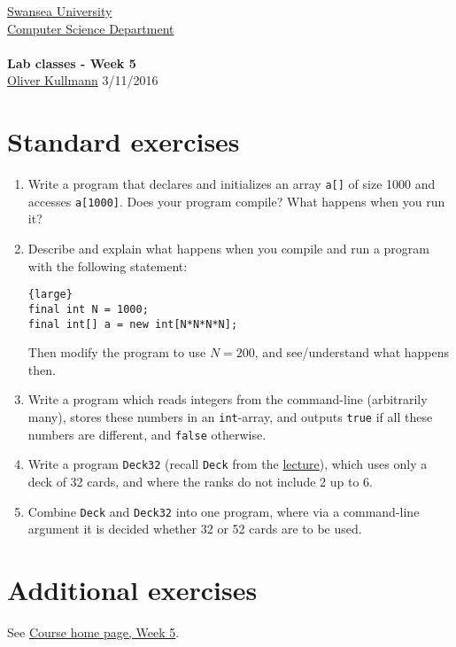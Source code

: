 \documentclass[11pt]{article}
\newcommand{\Java}{\lstset{language=Java,keywordstyle=\bfseries,breaklines,breakindent=30pt}}
\begin{document}
\begin{center}
  \href{http://www.swan.ac.uk/}{Swansea University}\\
  \href{http://www.swan.ac.uk/compsci/}{Computer Science Department}\\[1ex]
  \href{\chp}{\module}\\[1ex]
  \textbf{Lab classes - Week 5}\\
  \href{http://cs.swan.ac.uk/~csoliver}{Oliver Kullmann} 3/11/2016
\end{center}

\section{Standard exercises}
\label{sec:stdex}

\Java

\begin{enumerate}
\item Write a program that declares and initializes an array \texttt{a[]} of size 1000 and accesses \texttt{a[1000]}. Does your program compile? What happens when you run it?
\item Describe and explain what happens when you compile and run a program with the following statement:
  \begin{lstlisting}{large}
final int N = 1000;
final int[] a = new int[N*N*N*N];
  \end{lstlisting}
  Then modify the program to use $N = 200$, and see/understand what happens then.
\item Write a program which reads integers from the command-line (arbitrarily many), stores these numbers in an \texttt{int}-array, and outputs \texttt{true} if all these numbers are different, and \texttt{false} otherwise.
\item Write a program \texttt{Deck32} (recall \texttt{Deck} from the \href{http://cs.swan.ac.uk/~csoliver/ProgrammingJava201415_MgQxuCUrrS/index.html#LecturesWeek05}{lecture}), which uses only a deck of 32 cards, and where the ranks do not include 2 up to 6.
\item Combine \texttt{Deck} and \texttt{Deck32} into one program, where via a command-line argument it is decided whether 32 or 52 cards are to be used.
\end{enumerate}


\section{Additional exercises}
\label{sec:addex}

See \href{\chp#ExercisesWeek05}{Course home page, Week 5}.
\end{document}
